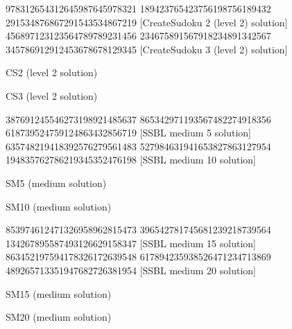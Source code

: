 \documentclass[twoside]{article}
\begin{document}
\renewcommand*{\puzzlefile}{cs2.ans}
\writepuzzle%
{978312654}{312645987}{645978321}%
{189423765}{423756198}{756189432}%
{291534876}{867291543}{534867219}%
[CreateSudoku 2 (level 2) solution]
\renewcommand*{\puzzlefile}{cs3.ans}
\writepuzzle%
{456897123}{123564789}{789231456}%
{234675891}{567918234}{891342567}%
{345786912}{912453678}{678129345}%
[CreateSudoku 3 (level 2) solution]
\vfill
\noindent\begin{minipage}{0.47\linewidth}\begin{center}
CS2 (level 2 solution) \\
\end{center}\end{minipage}
\hfill
\begin{minipage}{0.47\linewidth}\begin{center}
CS3 (level 2 solution) \\
\end{center}\end{minipage}


\renewcommand*{\puzzlefile}{sm5.ans}
\writepuzzle%
{387691245}{546273198}{921485637}%
{865342971}{193567482}{274918356}%
{618739524}{759124863}{432856719}%
[SSBL medium 5 solution]
\renewcommand*{\puzzlefile}{sm10.ans}
\writepuzzle%
{635748219}{418392576}{279561483}%
{527984631}{941653827}{863127954}%
{194835762}{786219345}{352476198}%
[SSBL medium 10 solution]
\vfill
\noindent\begin{minipage}{0.47\linewidth}\begin{center}
SM5 (medium solution) \\
\end{center}\end{minipage}
\hfill
\begin{minipage}{0.47\linewidth}\begin{center}
SM10 (medium solution) \\
\end{center}\end{minipage}

\renewcommand*{\puzzlefile}{sm15.ans}
\writepuzzle%
{853974612}{471326958}{962815473}%
{396542781}{745681239}{218739564}%
{134267895}{587493126}{629158347}%
[SSBL medium 15 solution]
\renewcommand*{\puzzlefile}{sm20.ans}
\writepuzzle%
{863452197}{594178326}{172639548}%
{617894235}{938526471}{234713869}%
{489265713}{351947682}{726381954}%
[SSBL medium 20 solution]
\vfill
\noindent\begin{minipage}{0.47\linewidth}\begin{center}
SM15 (medium solution) \\
\end{center}\end{minipage}
\hfill
\begin{minipage}{0.47\linewidth}\begin{center}
SM20 (medium solution) \\
\end{center}\end{minipage}
\end{document}
